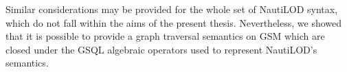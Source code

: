 \begin{example}
\end{example}


Similar considerations may be provided for the whole set of NautiLOD syntax, which  do not fall within the aims of the present thesis. Nevertheless, we showed that it is possible to provide a graph traversal semantics on GSM which are closed under the GSQL algebraic operators used to represent NautiLOD's semantics.

